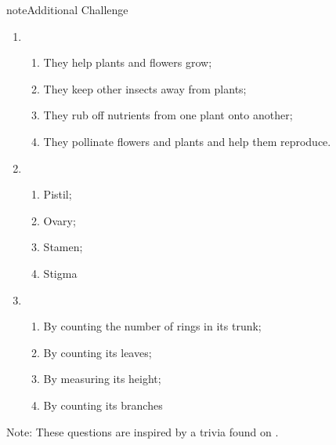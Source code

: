 \documentclass[letterpaper,10pt,english,openany,oneside]{sphinxmanual}
\begin{document}
\begin{sphinxadmonition}{note}{Additional Challenge}
\begin{enumerate}
%
\item {} 
\begin{enumerate}
%
\item {} 
They help plants and flowers grow;

\item {} 
They keep other insects away from plants;

\item {} 
They rub off nutrients from one plant onto another;

\item {} 
They pollinate flowers and plants and help them reproduce.

\end{enumerate}

\item {} 
\begin{enumerate}
%
\item {} 
Pistil;

\item {} 
Ovary;

\item {} 
Stamen;

\item {} 
Stigma

\end{enumerate}

\item {} 
\begin{enumerate}
%
\item {} 
By counting the number of rings in its trunk;

\item {} 
By counting its leaves;

\item {} 
By measuring its height;

\item {} 
By counting its branches

\end{enumerate}

\end{enumerate}

Note: These questions are inspired by a trivia found on .
\end{sphinxadmonition}
\end{document}

